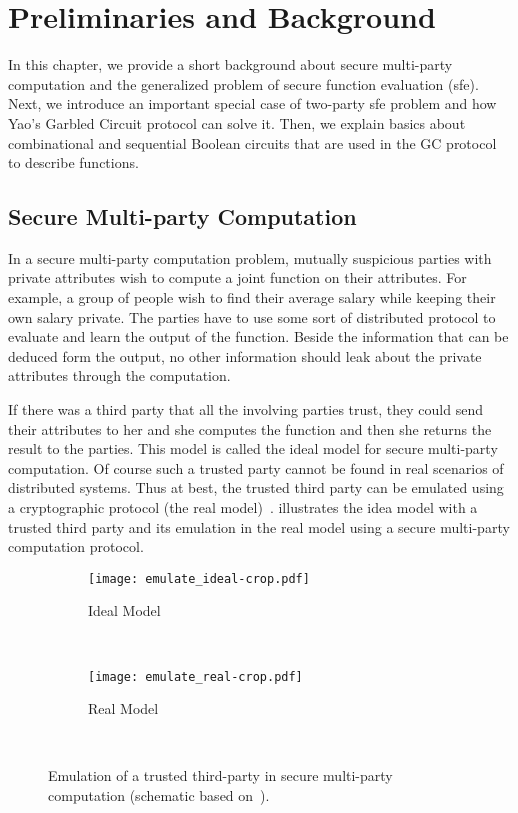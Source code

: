 \chapter{Preliminaries and Background}\label{ch:prelim}
In this chapter, we provide a short background about secure multi-party computation and the generalized problem of secure function evaluation (\acrshort{sfe}).
Next, we introduce an important special case of two-party \acrshort{sfe} problem and how Yao's Garbled Circuit protocol can solve it.
Then, we explain basics about combinational and sequential Boolean circuits that are used in the GC protocol to describe functions.

\section{Secure Multi-party Computation}\label{sec:prelim-smc}
In a secure multi-party computation problem, mutually suspicious parties with private attributes wish to compute a joint function on their attributes.
For example, a group of people wish to find their average salary while keeping their own salary private.
The parties have to use some sort of distributed protocol to evaluate and learn the output of the function.
Beside the information that can be deduced form the output, no other information should leak about the private attributes through the computation.

If there was a third party that all the involving parties trust, they could send their attributes to her and she computes the function and then she returns the result to the parties.
This model is called the ideal model for secure multi-party computation.
Of course such a trusted party cannot be found in real scenarios of distributed systems.
Thus at best, the trusted third party can be emulated using a cryptographic protocol (the real model)~\cite{goldreich2013general}.
 illustrates the idea model with a trusted third party and its emulation in the real model using a secure multi-party computation protocol.

\begin{figure}[ht]
    \centering
    \begin{subfigure}[tl]{0.35\textwidth}
        \texttt{[image: emulate\_ideal-crop.pdf]}
        \caption{Ideal Model}\label{fig:ideal-model}
    \end{subfigure}
		~~~~
    \begin{subfigure}[tr]{0.35\textwidth}
        \texttt{[image: emulate\_real-crop.pdf]}
        \caption{Real Model}\label{fig:real-model}
    \end{subfigure}\\
    \caption{Emulation of a trusted third-party in secure multi-party computation (schematic based on~\cite{goldreich2013general}).}\label{fig:multi-party-model}
\end{figure}

